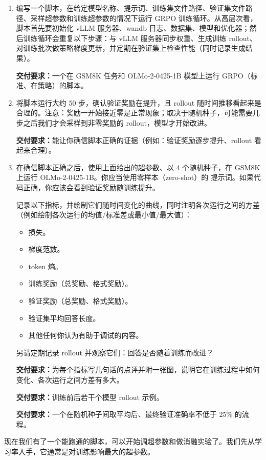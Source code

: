\begin{enumerate}[label=(\alph*)]
  \item 编写一个脚本，在给定模型名称、提示词、训练集文件路径、验证集文件路径、采样超参数和训练超参数的情况下运行 GRPO 训练循环。从高层次看，脚本首先要初始化 vLLM 服务器、wandb 日志、数据集、模型和优化器；然后训练循环会重复以下步骤：与 vLLM 服务器同步权重、生成训练 rollout、对训练批次做策略梯度更新，并定期在验证集上检查性能（同时记录生成结果）。

  \textbf{交付要求：}一个在 GSM8K 任务和 OLMo-2-0425-1B 模型上运行 GRPO（标准、在策略）的脚本。

  \item 将脚本运行大约 50 步，确认验证奖励在提升，且 rollout 随时间推移看起来是合理的。注意：奖励一开始接近零是正常现象；取决于随机种子，可能需要几步之后我们才会采样到非零奖励的 rollout，模型才开始改进。

  \textbf{交付要求：}能让你确信脚本正确的证据（例如：验证奖励逐步提升、rollout 看起来合理）。

  \item 在确信脚本正确之后，使用上面给出的超参数、以 4 个随机种子，在 GSM8K 上运行 OLMo-2-0425-1B。你应当使用零样本（zero-shot）的  提示词。如果代码正确，你应该会看到验证奖励随训练提升。

  记录以下指标，并绘制它们随时间变化的曲线，同时注明各次运行之间的方差（例如绘制各次运行的均值/标准差或最小值/最大值）：
  \begin{itemize}
    \item 损失。
    \item 梯度范数。
    \item token 熵。
    \item 训练奖励（总奖励、格式奖励）。
    \item 验证奖励（总奖励、格式奖励）。
    \item 验证集平均回答长度。
    \item 其他任何你认为有助于调试的内容。
  \end{itemize}
  另请定期记录 rollout 并观察它们：回答是否随着训练而改进？

  \textbf{交付要求：}为每个指标写几句话的点评并附一张图，说明它在训练过程中如何变化、各次运行之间方差有多大。

  \textbf{交付要求：}训练前后若干个模型 rollout 示例。

  \textbf{交付要求：}一个在随机种子间取平均后、最终验证准确率不低于 25\% 的流程。
\end{enumerate}

现在我们有了一个能跑通的脚本，可以开始调超参数和做消融实验了。我们先从学习率入手，它通常是对训练影响最大的超参数。

